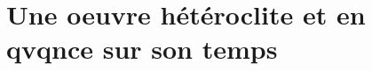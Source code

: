 
\section{Une oeuvre hétéroclite et en qvqnce sur son temps}

\subsection{}

\subsection{}

\subsection{}
